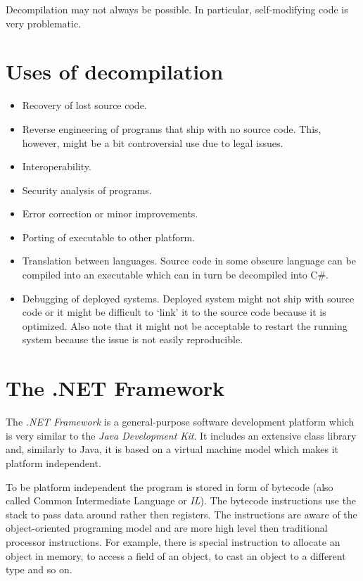 \documentclass[12pt,twoside,notitlepage]{report}
\begin{document}
Decompilation may not always be possible.  In particular,
self-modifying code is very problematic.

\section{Uses of decompilation}

\begin{itemize}
    \item Recovery of lost source code.
	\item Reverse engineering of programs that ship with no
	  source code.  This, however, might be a bit controversial use
	  due to legal issues.
	\item Interoperability.
	\item Security analysis of programs.
	\item Error correction or minor improvements.
	\item Porting of executable to other platform.
	\item Translation between languages.
      Source code in some obscure language can be compiled into an 
      executable which can in turn be decompiled into C\#.
    \item Debugging of deployed systems.  Deployed system
      might not ship with source code or it might be difficult
      to `link' it to the source code because it is optimized.
      Also note that it might not be acceptable to restart 
      the running system because the issue is not easily reproducible.
\end{itemize}

\section{The .NET Framework}

The \emph{.NET Framework} is a general-purpose software development platform 
which is very similar to the \emph{Java Development Kit}.
It includes an extensive class library 
and, similarly to Java, it is based on a virtual machine model which
makes it platform independent.

To be platform independent the program is stored in form of bytecode
(also called Common Intermediate Language or \emph{IL}).
The bytecode instructions use the stack to pass data around rather then
registers.
The instructions are aware of the object-oriented programing
model and are more high level then traditional processor instructions.
For example, there is special instruction to allocate an object in memory,
to access a field of an object, to cast an object to a different type
and so on.
\end{document}
